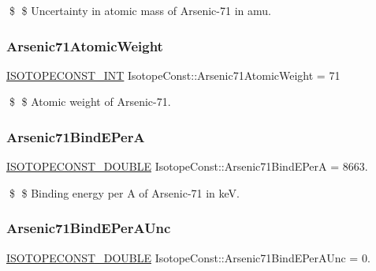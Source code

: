 \$ \$ Uncertainty in atomic mass of Arsenic-\/71 in amu. \mbox{\label{group___isotope_const-_arsenic-_as71_ga4c10485f4e4b6f8e997e41df92700a24}} 
\subsubsection{\texorpdfstring{Arsenic71\+Atomic\+Weight}{Arsenic71AtomicWeight}}
{\footnotesize\ttfamily \mbox{\hyperlink{group___isotope_const-_macros_ga5f18360b3e99483a35c32d789e62621c}{I\+S\+O\+T\+O\+P\+E\+C\+O\+N\+S\+T\+\_\+\+I\+NT}} Isotope\+Const\+::\+Arsenic71\+Atomic\+Weight = 71}

\$ \$ Atomic weight of Arsenic-\/71. \mbox{\label{group___isotope_const-_arsenic-_as71_gabe784c6d5e72d5f8c7221651ccc0d3f0}} 
\subsubsection{\texorpdfstring{Arsenic71\+Bind\+E\+PerA}{Arsenic71BindEPerA}}
{\footnotesize\ttfamily \mbox{\hyperlink{group___isotope_const-_macros_ga8f45a7272ce02c0b4c65c44636ed719a}{I\+S\+O\+T\+O\+P\+E\+C\+O\+N\+S\+T\+\_\+\+D\+O\+U\+B\+LE}} Isotope\+Const\+::\+Arsenic71\+Bind\+E\+PerA = 8663.}

\$ \$ Binding energy per A of Arsenic-\/71 in keV. \mbox{\label{group___isotope_const-_arsenic-_as71_gae52d576924898671276a21722e46fc17}} 
\subsubsection{\texorpdfstring{Arsenic71\+Bind\+E\+Per\+A\+Unc}{Arsenic71BindEPerAUnc}}
{\footnotesize\ttfamily \mbox{\hyperlink{group___isotope_const-_macros_ga8f45a7272ce02c0b4c65c44636ed719a}{I\+S\+O\+T\+O\+P\+E\+C\+O\+N\+S\+T\+\_\+\+D\+O\+U\+B\+LE}} Isotope\+Const\+::\+Arsenic71\+Bind\+E\+Per\+A\+Unc = 0.}

